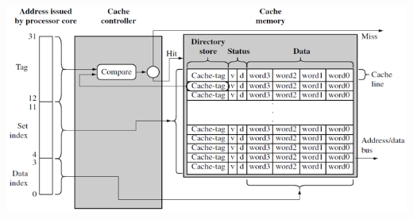 \documentclass{paper}
\begin{document}
\includegraphics[scale=0.7]{cachecontroller.png}
\end{document}
